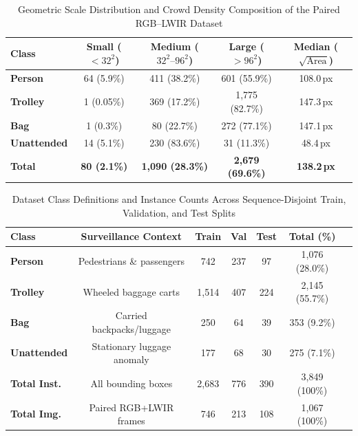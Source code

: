 \documentclass[journal,twoside,web]{ieeecolor}
\begin{document}
\begin{table}[t]
\centering
\caption{Geometric Scale Distribution and Crowd Density Composition of the Paired RGB--LWIR Dataset}
\label{tab:scene_composition}
\small
\setlength{\tabcolsep}{4pt}
\renewcommand{\arraystretch}{1.15}
\begin{tabular}{lcccc}
\toprule
\textbf{Class} & \textbf{Small ($<32^2$)} & \textbf{Medium ($32^2\text{--}96^2$)} & \textbf{Large ($>96^2$)} & \textbf{Median ($\sqrt{\text{Area}}$)} \\
\midrule
\textbf{Person}     & 64 (5.9\%)   & 411 (38.2\%) & 601 (55.9\%)     & 108.0\,px \\
\textbf{Trolley}    & 1 (0.05\%)   & 369 (17.2\%) & 1{,}775 (82.7\%) & 147.3\,px \\
\textbf{Bag}        & 1 (0.3\%)    & 80 (22.7\%)  & 272 (77.1\%)     & 147.1\,px \\
\textbf{Unattended} & 14 (5.1\%)   & 230 (83.6\%) & 31 (11.3\%)      & 48.4\,px \\
\midrule
\textbf{Total}      & \textbf{80 (2.1\%)} & \textbf{1{,}090 (28.3\%)} & \textbf{2{,}679 (69.6\%)} & \textbf{138.2\,px} \\
\bottomrule
\end{tabular}
\end{table}

\begin{table}[t]
\centering
\caption{Dataset Class Definitions and Instance Counts Across Sequence-Disjoint Train, Validation, and Test Splits}
\label{tab:dataset_distribution}
\small
\setlength{\tabcolsep}{2.5pt}
\renewcommand{\arraystretch}{1.15}
\begin{tabular}{lcccccc}
\toprule
\textbf{Class} & \textbf{Surveillance Context} & \textbf{Train} & \textbf{Val} & \textbf{Test} & \textbf{Total (\%)} \\
\midrule
\textbf{Person}     & Pedestrians \& passengers  & 742     & 237 & 97  & 1{,}076 (28.0\%) \\
\textbf{Trolley}    & Wheeled baggage carts      & 1{,}514 & 407 & 224 & 2{,}145 (55.7\%) \\
\textbf{Bag}        & Carried backpacks/luggage  & 250     & 64  & 39  & 353 (9.2\%) \\
\textbf{Unattended} & Stationary luggage anomaly & 177     & 68  & 30  & 275 (7.1\%) \\
\midrule
\textbf{Total Inst.}& All bounding boxes         & 2{,}683 & 776 & 390 & 3{,}849 (100\%) \\
\textbf{Total Img.} & Paired RGB+LWIR frames     & 746     & 213 & 108 & 1{,}067 (100\%) \\
\bottomrule
\end{tabular}
\end{table}
\end{document}
